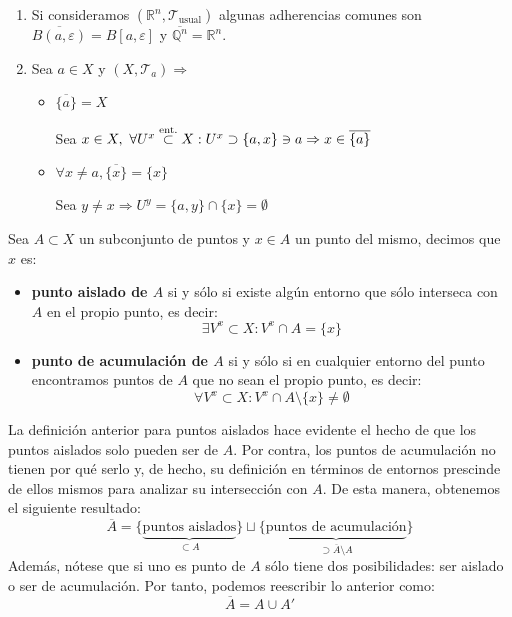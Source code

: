\begin{ej}
\begin{enumerate}
    \item Si consideramos $\left( \mathbb{R}^n, \mathcal{T}_{\text{usual}} \right)$ algunas adherencias comunes son $\overline{B \left( a, \varepsilon \right)} = B\left[ a, \varepsilon \right]$ y $\overline{\mathbb{Q}^n} = \mathbb{R}^n$.
    \item Sea $a \in X$ y $\left( X, \mathcal{T}_a \right) \Rightarrow$
    \begin{itemize}
        \item $\overline{\{a\}} = X $
        \begin{demo}
            Sea $x \in X,\ \forall U^x \stackrel{\text{ent.}}{\subset} X: U^x \supset \{a, x\} \ni a \Rightarrow x \in \overline{\{a\}}$
        \end{demo}
        \item $\forall x \neq a, \overline{\{x\}} = \{x\}$
        \begin{demo}
            Sea $y \neq x \Rightarrow U^y = \{a, y\} \cap \{x\} = \emptyset$ 
        \end{demo}
    \end{itemize}
\end{enumerate}
\end{ej}

\begin{defi}[Acumulación]    
Sea $A\subset X$ un subconjunto de puntos y $x\in A$ un punto del mismo, decimos que $x$ es:
\begin{itemize}
\item \textbf{punto aislado de $A$} si y sólo si existe algún entorno que sólo interseca con $A$ en el propio punto, es decir:
$$
\exists V^x \subset X : V^x \cap A = \{x\}
$$
\item \textbf{punto de acumulación de $A$} si y sólo si en cualquier entorno del punto encontramos puntos de $A$ que no sean el propio punto, es decir:
$$
\forall V^x \subset X : V^x \cap A \setminus \{x\} \neq \emptyset
$$
\end{itemize}
\end{defi}

\begin{obs}
La definición anterior para puntos aislados hace evidente el hecho de que los puntos aislados solo pueden ser de $A$. Por contra, los puntos de acumulación no tienen por qué serlo y, de hecho, su definición en términos de entornos prescinde de ellos mismos para analizar su intersección con $A$. De esta manera, obtenemos el siguiente resultado:
$$
\overline{A} = \{\underbrace{\text{puntos aislados}}_{\subset A}\} \sqcup \{\underbrace{\text{puntos de acumulación}}_{\supset \overline{A} \setminus A}\}
$$
Además, nótese que si uno es punto de $A$ sólo tiene dos posibilidades: ser aislado o ser de acumulación. Por tanto, podemos reescribir lo anterior como:
$$
\overline{A} = A \cup A'
$$
\end{obs}

